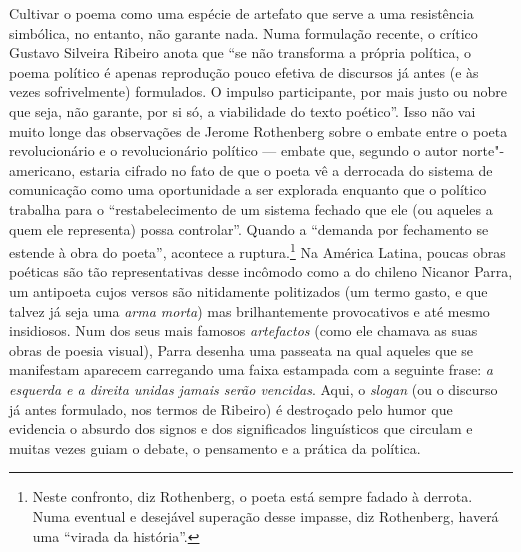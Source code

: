 Cultivar o poema como uma espécie de artefato que serve a uma
resistência simbólica, no entanto, não garante nada. Numa formulação
recente, o crítico Gustavo Silveira Ribeiro anota que ``se não
transforma a própria política, o poema político é apenas reprodução
pouco efetiva de discursos já antes (e às vezes sofrivelmente)
formulados. O impulso participante, por mais justo ou nobre que seja,
não garante, por si só, a viabilidade do texto poético''. Isso não vai
muito longe das observações de Jerome Rothenberg sobre o embate entre o
poeta revolucionário e o revolucionário político --- embate que, segundo o
autor norte"-americano, estaria cifrado no fato de que o poeta vê a
derrocada do sistema de comunicação como uma oportunidade a ser
explorada enquanto que o político trabalha para o ``restabelecimento de
um sistema fechado que ele (ou aqueles a quem ele representa) possa
controlar''. Quando a ``demanda por fechamento se estende à obra do
poeta'', acontece a ruptura.\footnote{Neste confronto, diz Rothenberg, o
  poeta está sempre fadado à derrota. Numa eventual e desejável
  superação desse impasse, diz Rothenberg, haverá uma ``virada da
  história''.} Na América Latina, poucas obras poéticas são tão
representativas desse incômodo como a do chileno Nicanor Parra, um
antipoeta cujos versos são nitidamente politizados (um termo gasto, e
que talvez já seja uma \emph{arma morta}) mas brilhantemente
provocativos e até mesmo insidiosos. Num dos seus mais famosos
\emph{artefactos} (como ele chamava as suas obras de poesia visual),
Parra desenha uma passeata na qual aqueles que se manifestam aparecem
carregando uma faixa estampada com a seguinte frase: \emph{a esquerda e
a direita unidas jamais serão vencidas}. Aqui, o \emph{slogan} (ou o
discurso já antes formulado, nos termos de Ribeiro) é destroçado pelo
humor que evidencia o absurdo dos signos e dos significados linguísticos
que circulam e muitas vezes guiam o debate, o pensamento e a prática da
política.

\asterisc

